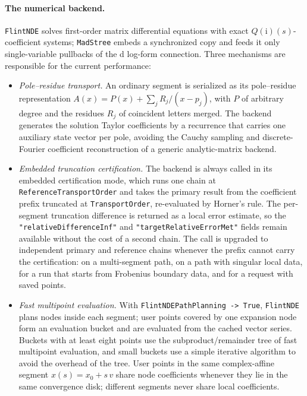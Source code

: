 \documentclass[11pt,a4paper]{article}
\numberwithin{table}{section}
\newcommand{\ii}{\mathrm i}
\begin{document}
\paragraph{The numerical backend.}
\label{sec:backend}

\texttt{FlintNDE} solves first-order matrix differential equations with exact
$Q(\ii)(s)$-coefficient systems; \texttt{MadStree} embeds a synchronized copy and
feeds it only single-variable pullbacks of the d log-form connection. Three mechanisms are responsible
for the current performance:
\begin{itemize}
  \item \emph{Pole--residue transport.} An ordinary segment is serialized as its pole--residue
        representation $A(x)=P(x)+\sum_jR_j/(x-p_j)$, with $P$ of arbitrary degree and the residues
        $R_j$ of coincident letters merged. The backend generates the solution Taylor coefficients
        by a recurrence that carries one auxiliary state vector per pole, avoiding the Cauchy sampling
        and discrete-Fourier coefficient reconstruction of a generic analytic-matrix backend.
  \item \emph{Embedded truncation certification.} The backend is always called in its embedded
        certification mode, which runs one chain at \texttt{ReferenceTransportOrder} and takes the
        primary result from the coefficient prefix truncated at \texttt{TransportOrder}, re-evaluated
        by Horner's rule. The per-segment truncation difference is returned as a local error estimate,
        so the \texttt{"relativeDifferenceInf"} and \texttt{"targetRelativeErrorMet"} fields remain
        available without the cost of a second chain. The call is upgraded to independent primary and
        reference chains whenever the prefix cannot carry the certification: on a multi-segment path,
        on a path with singular local data, for a run that starts from Frobenius boundary data, and
        for a request with saved points.
  \item \emph{Fast multipoint evaluation.} With \texttt{FlintNDEPathPlanning -> True}, \texttt{FlintNDE}
        plans nodes inside each segment; user points covered by one expansion node form an
        evaluation bucket and are evaluated from the cached vector series. Buckets with at least
        eight points use the subproduct/remainder tree of fast multipoint evaluation, and small
        buckets use a simple iterative algorithm to avoid the overhead of the tree. User points in the same
        complex-affine segment $x(s)=x_0+s\,v$ share node coefficients whenever they lie in the same
        convergence disk; different segments never share local coefficients.
\end{itemize}
\end{document}
